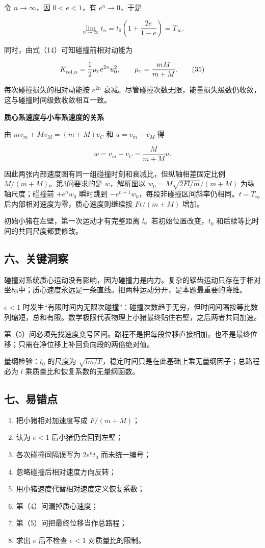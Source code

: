 \documentclass[12pt,a4paper,UTF8]{ctexart}
\newcommand{\tightlist}{\setlength{\itemsep}{0pt}\setlength{\parskip}{0pt}}
\begin{document}
令 \(n\to\infty\)，因 \(0<e<1\)，有 \(e^n\to0\)，于是

\[
\lim_{n\to\infty}t_n
=t_0\left(1+\frac{2e}{1-e}\right)
=T_\infty.
\]

同时，由式（14）可知碰撞前相对动能为

\[
K_{{\rm rel},n}^-
=\frac12\mu_r e^{2n}u_0^2,
\qquad
\mu_r=\frac{mM}{m+M}.
\tag{35}
\]

每次碰撞损失的相对动能按 \(e^{2n}\)
衰减。尽管碰撞次数无限，能量损失级数仍收敛，这与碰撞时间级数收敛相互一致。

\textbf{质心系速度与小车系速度的关系}

由 \(mv_m+Mv_M=(m+M)v_C\) 和 \(u=v_m-v_M\) 得

\[w=v_m-v_C=\frac{M}{m+M}u.\]

因此两张内部速度图有同一组碰撞时刻和衰减比，但纵轴相差固定比例
\(M/(m+M)\)。第3问要求的是 \(w\)，解析图以 \(w_0=M\sqrt{2Fl/m}/(m+M)\)
为纵轴尺度；碰撞前 \(+e^nw_0\) 瞬时跳到
\(-e^{n+1}w_0\)，每段非碰撞区间斜率仍相同。\(t=T_\infty\)
后内部相对速度为零，质心速度则继续按 \(Ft/(m+M)\) 增加。

初始小猪在左壁，第一次运动才有完整距离 \(l\)。若初始位置改变，\(t_0\)
和后续等比时间的共同尺度都要修改。

\subsection{六、关键洞察}\label{ux516dux5173ux952eux6d1eux5bdf}

碰撞对系统质心运动没有影响，因为碰撞力是内力。复杂的锯齿运动只存在于相对坐标中；质心速度永远是一条直线。把两种运动分开，是本题最重要的降维。

\(e<1\)
时发生``有限时间内无限次碰撞''：碰撞次数趋于无穷，但时间间隔按等比数列缩短，总和有限。数学极限代表物理上小猪最终贴住右壁，之后两者共同加速。

第（5）问必须先找速度变号区间。路程不是把每段位移直接相加，也不是最终位移；只需在净位移上补回负向段的两倍绝对值。

量纲检验：\(t_0\) 的尺度为
\(\sqrt{lm/F}\)，稳定时间只是在此基础上乘无量纲因子；总路程必为 \(l\)
乘质量比和恢复系数的无量纲函数。

\subsection{七、易错点}\label{ux4e03ux6613ux9519ux70b9}

\begin{enumerate}
\def\labelenumi{\arabic{enumi}.}
\tightlist
\item
  把小猪相对加速度写成 \(F/(m+M)\)；
\item
  认为 \(e<1\) 后小猪仍会回到左壁；
\item
  各次碰撞间隔误写为 \(2e^nt_0\) 而未统一编号；
\item
  忽略碰撞后相对速度方向反转；
\item
  用小猪速度代替相对速度定义恢复系数；
\item
  第（4）问漏掉质心速度；
\item
  第（5）问把最终位移当作总路程；
\item
  求出 \(e\) 后不检查 \(e<1\) 对质量比的限制。
\end{enumerate}
\end{document}
